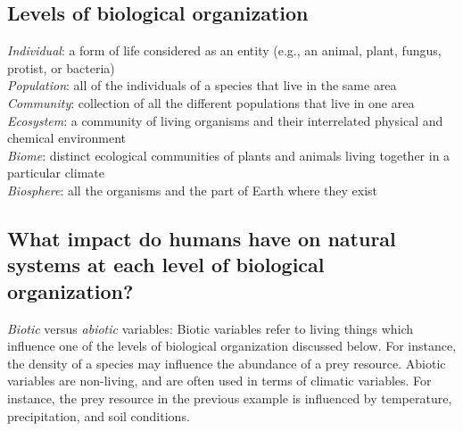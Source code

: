 \documentclass[12pt]{article}
\begin{document}
\subsection*{Levels of biological organization}


\textit{Individual}: a form of life considered as an entity (e.g., an animal, plant, fungus, protist, or bacteria) \\


\textit{Population}: all of the individuals of a species that live in the same area \\


\textit{Community}: collection of all the different populations that live in one area \\


\textit{Ecosystem}: a community of living organisms and their interrelated physical and chemical environment \\



\textit{Biome}: distinct ecological communities of plants and animals living together in a particular climate \\



\textit{Biosphere}: all the organisms and the part of Earth where they exist \\







% 
%
% 
% 
%





%
%
%
%









\subsection*{What impact do humans have on natural systems at each level of biological organization?}

\textit{Biotic} versus \textit{abiotic} variables: Biotic variables refer to living things which influence one of the levels of biological organization discussed below. For instance, the density of a species may influence the abundance of a prey resource. Abiotic variables are non-living, and are often used in terms of climatic variables. For instance, the prey resource in the previous example is influenced by temperature, precipitation, and soil conditions. \\
\end{document}

